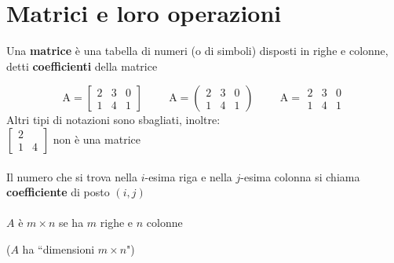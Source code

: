 \section{Matrici e loro operazioni} 
Una \textbf{matrice} è una tabella di numeri (o di simboli) disposti in righe e colonne, 
detti \textbf{coefficienti} della matrice

$$
\textrm{A}= 
\begin{bmatrix}
    2 & 3 & 0\\
    1 & 4 & 1 
\end{bmatrix}\hspace{1cm}
\textrm{A}= 
\begin{pmatrix}
    2 & 3 & 0\\
    1 & 4 & 1 
\end{pmatrix}\hspace{1cm}
\textrm{A}= 
\begin{matrix}
    2 & 3 & 0\\
    1 & 4 & 1 
\end{matrix}
$$
Altri tipi di notazioni sono sbagliati, inoltre:\\

$
\begin{bmatrix}
    2 & \\
    1 & 4
\end{bmatrix}
$ non è una matrice 
\\
\\
Il numero che si trova nella $i$-esima riga e nella $j$-esima colonna si chiama 
\textbf{coefficiente} di posto $(i,j)$
\\
\\
$A$ è $m\times n$ se ha $m$ righe e $n$ colonne

{\scriptsize ($A$ ha ``dimensioni $m\times n$") }

